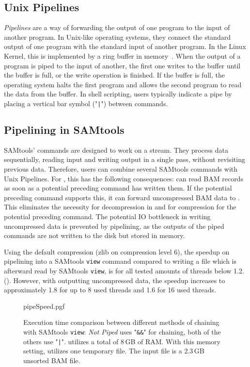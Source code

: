 \subsection{Unix Pipelines}

\textit{Pipelines} are a way of forwarding the output of one program to the input of another program. In Unix-like operating systems, they connect the standard output of one program with the standard input of another program. In the Linux Kernel, this is implemented by a ring buffer in memory~\cite{noauthor_linuxfspipec_nodate}. When the output of a program is piped to the input of another, the first one writes to the buffer until the buffer is full, or the write operation is finished. If the buffer is full, the operating system halts the first program and allows the second program to read the data from the buffer. In shell scripting, users typically indicate a pipe by placing a vertical bar symbol ("\texttt{|}") between commands.



\subsection{Pipelining in SAMtools}
SAMtools' commands are designed to work on a stream. They process data sequentially, reading input and writing output in a single pass, without revisiting previous data.
Therefore, users can combine several SAMtools commands with Unix Pipelines. For \sort, this has the following consequences: \sort can read BAM records as soon as a potential preceding command has written them. If the potential preceding command supports this, it can forward uncompressed BAM data to \sort. This eliminates the necessity for decompression in \sort and for compression for the potential preceding command. The potential IO bottleneck in writing uncompressed data is prevented by pipelining, as the outputs of the piped commands are not written to the disk but stored in memory.

Using the default compression (zlib on compression level 6), the speedup on pipelining \sort into a SAMtools \texttt{view} command compared to \sort writing a file which is afterward read by SAMtools \texttt{view}, is for all tested amounts of threads below 1.2.().
However, with \sort outputting uncompressed data, the speedup increases to approximately 1.8 for up to 8 used threads and 1.6 for 16 used threads.
\begin{figure}[h]
        {pipeSpeed.pgf}
    \caption{Execution time comparison between different methods of chaining \sort with SAMtools \texttt{view}: \textit{Not Piped} uses "\texttt{\&\&}" for chaining, both of the others use "\texttt{|}". \sort utilizes a total of 8\,GB of RAM. With this memory setting, \sort utilizes one temporary file. \threads \points The input file is a 2.3\,GB unsorted BAM file. 
    }
    \label{fig:pipeSpeeds}
\end{figure}

